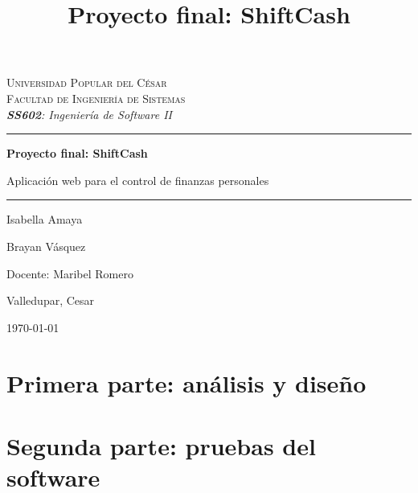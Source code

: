 \documentclass[stu,12pt,biblatex,floatsintext]{apa7}
\title{Proyecto final: ShiftCash}
\begin{document}
\begin{titlepage}
    \centering
    \textsc{\large Universidad Popular del César}\\[0.2cm]
    \textsc{\normalsize Facultad de Ingeniería de Sistemas}\\[0.15cm]
    \textit{\textbf{SS602}: Ingeniería de Software II}
    \rule{\textwidth}{0.6pt}
    {\Large \bfseries Proyecto final: ShiftCash\par}
    \vspace{0.2cm}
    {\normalsize Aplicación web para el control de finanzas personales\par}
    \vspace{0.5cm}
    \rule{\textwidth}{0.6pt}
    \vspace{3cm}
    {\large Isabella Amaya\par}
    \vspace{0.2cm}
    {\large Brayan Vásquez\par}
    \vspace{1.5cm}
    {\normalsize Docente: Maribel Romero\par}
    \vfill
    {\normalsize Valledupar, Cesar\par}
    \vspace{0.1cm}
    {\normalsize \today\par}
\end{titlepage}

\tableofcontents
\newpage

\part*{Primera parte: análisis y diseño}








\newpage
\part*{Segunda parte: pruebas del software}
\setcounter{section}{0} %






\end{document}
